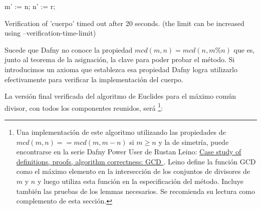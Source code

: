 \documentclass[12pt, a4paper, openany, fleqn]{book}
\begin{document}
    \begin{whitebox}
    \begin{dafny}[gobble=8,firstnumber=8]
            m' := n;
            n' := r;
    \end{dafny}
    \end{whitebox}
    \begin{redbox}[after skip=2ex]
    \begin{dafny}[gobble=8,firstnumber=11]
        }
    \end{dafny}
    \end{redbox}

    \begin{redbox}[beforeafter skip=2ex]
        Verification of 'cuerpo' timed out after 20 seconds. (the limit can be increased using --verification-time-limit)
    \end{redbox}


    Sucede que Dafny no conoce la propiedad $mcd(m, n) = mcd(n, m\%n)$ que es, junto al teorema de la asignación, la clave para poder probar el método. Si introducimos un axioma que establezca esa propiedad Dafny logra utilizarlo efectivamente para verificar la implementación del cuerpo.

    \begin{greenbox}
    \end{greenbox}

    La versión final verificada del algoritmo de Euclides para el máximo común divisor, con todos los componentes reunidos, será \footnote{
    Una implementación de este algoritmo utilizando las propiedades de $mcd(m, n) == mcd(m, m - n)$ si $m \ge n$ y la de simetría, puede encontrarse en la serie Dafny Power User de Rustan Leino: \href{https://leino.science/papers/krml279.html}{Case study of definitions, proofs, algorithm correctness: GCD
    }. Leino define la función GCD como el máximo elemento en la intersección de los conjuntos de divisores de $m$ y $n$ y luego utiliza esta función en la especificación del método. Incluye también las pruebas de los lemmas necesarios. Se recomienda su lectura como complemento de esta sección.}:
\end{document}
